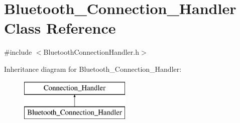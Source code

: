 \hypertarget{class_bluetooth___connection___handler}{\section{\-Bluetooth\-\_\-\-Connection\-\_\-\-Handler \-Class \-Reference}
\label{class_bluetooth___connection___handler}
}


{\ttfamily \#include $<$\-Bluetooth\-Connection\-Handler.\-h$>$}

\-Inheritance diagram for \-Bluetooth\-\_\-\-Connection\-\_\-\-Handler\-:\begin{figure}[H]
\begin{center}
\leavevmode
\includegraphics[height=2.000000cm]{class_bluetooth___connection___handler}
\end{center}
\end{figure}
